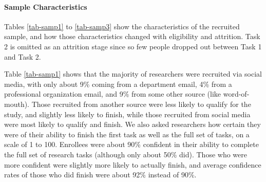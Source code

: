 \documentclass[
  letterpaper,
  DIV=11,
  numbers=noendperiod]{scrartcl}
\let\oldparagraph\paragraph
\renewcommand{\paragraph}[1]{\oldparagraph{#1}\mbox{}}
\begin{document}
\hypertarget{sample-characteristics}{%
\paragraph{Sample Characteristics}\label{sample-characteristics}}

Tables \ref{tab-samp1} to \ref{tab-samp3} show the characteristics of
the recruited sample, and how those characteristics changed with
eligibility and attrition. Task 2 is omitted as an attrition stage since
so few people dropped out between Task 1 and Task 2.

Table \ref{tab-samp1} shows that the majority of researchers were
recruited via social media, with only about 9\% coming from a department
email, 4\% from a professional organization email, and 9\% from some
other source (like word-of-mouth). Those recruited from another source
were less likely to qualify for the study, and slightly less likely to
finish, while those recruited from social media were most likely to
qualify and finish. We also asked researchers how certain they were of
their ability to finish the first task as well as the full set of tasks,
on a scale of 1 to 100. Enrollees were about 90\% confident in their
ability to complete the full set of research tasks (although only about
50\% did). Those who were more confident were slightly more likely to
actually finish, and average confidence rates of those who did finish
were about 92\% instead of 90\%.
\end{document}
